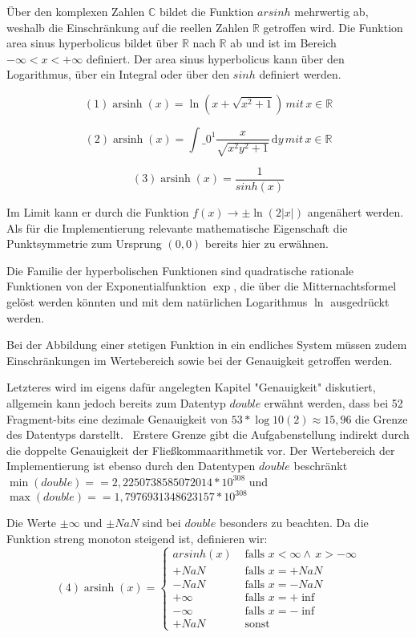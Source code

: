 \documentclass[course=erap]{aspdoc}
\begin{document}
    Über den komplexen Zahlen $\mathbb{C}$ bildet die Funktion $arsinh$ mehrwertig ab, weshalb die Einschränkung auf die reellen Zahlen $\mathbb{R}$ getroffen wird.
    Die Funktion area sinus hyperbolicus bildet über $\mathbb{R}$ nach $\mathbb{R}$ ab und ist im Bereich $-\infty < x < + \infty$ definiert.
    Der area sinus hyperbolicus kann über den Logarithmus, über ein Integral oder über den $sinh$ definiert werden.

    $$ (1) \operatorname{arsinh}(x) = \ln \left(x + \sqrt{x^2 + 1} \right) \, mit \, x \in \mathbb{R}$$

    $$ (2) \operatorname{arsinh}(x) = \int\_{0}^{1} \frac{x}{\sqrt{x^2 y^2 + 1}} \,\mathrm{d}y \, mit \, x \in \mathbb{R} $$

    $$ (3) \operatorname{arsinh}(x) = \frac{1}{sinh(x)} $$

    Im Limit kann er durch die Funktion $f(x)\to \pm \ln(2|x|)$ angenähert werden.
    Als für die Implementierung relevante mathematische Eigenschaft die Punktsymmetrie zum Ursprung $(0,0)$ bereits hier zu erwähnen.


    Die Familie der hyperbolischen Funktionen sind quadratische rationale Funktionen von der Exponentialfunktion $\exp$,
    die über die Mitternachtsformel gelöst werden könnten und mit dem natürlichen Logarithmus $\ln$ ausgedrückt werden.


    Bei der Abbildung einer stetigen Funktion in ein endliches System müssen zudem Einschränkungen im Wertebereich sowie bei der Genauigkeit getroffen werden.


    Letzteres wird im eigens dafür angelegten Kapitel "Genauigkeit" diskutiert, allgemein kann jedoch bereits zum Datentyp $double$ erwähnt werden, dass bei 52 Fragment-bits eine dezimale Genauigkeit von $53*\log10(2) \approx 15,96$ die Grenze des Datentyps darstellt.~\cite{StandardforBinaryFloating-PointArithmetic}
    Erstere Grenze gibt die Aufgabenstellung indirekt durch die doppelte Genauigkeit der Fließkommaarithmetik vor.
    Der Wertebereich der Implementierung ist ebenso durch den Datentypen $double$ beschränkt $\min(double) =  = 2,2250738585072014* 10^308$ und $\max(double) =  = 1,7976931348623157 * 10^308$


    Die Werte $\pm \infty$ und $\pm NaN$ sind bei $double$ besonders zu beachten.
    Da die Funktion streng monoton steigend ist, definieren wir:
    \[(4) \operatorname{arsinh}(x) =
    \begin{cases}
        arsinh(x)     & \text{ falls } x < \infty \wedge \, x > -\infty \\
        +NaN  & \text{ falls } x = +NaN \\
        -NaN  & \text{ falls } x = -NaN \\
        +\infty     & \text{ falls } x = +\inf \\
        -\infty     & \text{ falls } x = -\inf \\
        +NaN     & \text{ sonst }

    \end{cases}\]
\end{document}
